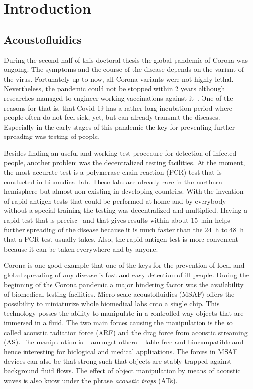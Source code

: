 \chapter{Introduction\label{ch:intro}}
\section{Acoustofluidics}

During the second half of this doctoral thesis the global pandemic of Corona 
was ongoing. The symptoms and the course of the disease depends on the variant 
of the virus. Fortunately up to now, all Corona variants were not highly 
lethal. Nevertheless, the pandemic could not be stopped within 2 years 
although researches managed to engineer working vaccinations against 
it~\cite{Polack2020,Mahase2020,Voysey2021}. One of the reasons for that is, 
that Covid-19 has a rather long incubation period where people often do not 
feel sick, yet, but can already transmit the diseases. Especially in the early 
stages of this pandemic the key for preventing further spreading was testing of 
people.

Besides finding an useful and working test procedure for detection of infected 
people, another problem was the decentralized testing facilities. At the 
moment, the most accurate test is a polymerase chain reaction (PCR) test that 
is conducted in biomedical lab. These labs are already rare in the northern 
hemisphere but almost non-existing in developing countries. With the invention 
of rapid antigen tests that could be performed at home and by everybody without 
a special training the testing was decentralized and multiplied. Having a rapid 
test that is precise~\cite{Albert2021} and that gives results within about 
\SI{15}{\minute} helps further spreading of the disease because it is much 
faster than the \SI{24}{\hour} to \SI{48}{\hour} that a PCR test usually takes. 
Also, the rapid antigen test is more convenient because it can be taken 
everywhere and by anyone.

Corona is one good example that one of the keys for the prevention of local and 
global spreading of any disease is fast and easy detection of ill people. 
During the beginning of the Corona pandemic a major hindering factor was the 
availability of biomedical testing facilities. Micro-scale acoustofluidics 
(MSAF) offers the possibility to miniaturize whole biomedical labs onto a 
single chip. This technology posses the ability to manipulate in a controlled 
way objects that are immersed in a fluid. The two main forces causing the 
manipulation is the so called acoustic radiation force (ARF) and the drag force 
from acoustic streaming (AS). The manipulation is -- amongst others -- 
lable-free and biocompatible and hence interesting for biological and medical 
applications. The forces in MSAF devices can also be that strong such that 
objects are stably trapped against background fluid flows. The effect of object 
manipulation by means of acoustic waves is also know under the phrase 
\emph{acoustic traps} (ATs).

